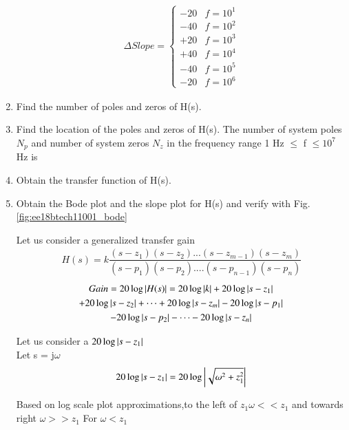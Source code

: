 \begin{enumerate}[label=\thesection.\arabic*.,ref=\thesection.\theenumi]
\begin{align}
 \Delta Slope = 
 \begin{cases} 
      -20 &  f = 10^{1} \\
      -40 &  f = 10^{2} \\
      +20 &  f = 10^{3} \\
      +40 &  f = 10^{4} \\
      -40 &  f = 10^{5} \\
      -20 &  f = 10^{6} 
 \end{cases}
\end{align}

\item Find the number of poles and zeros of H(s).
\\
\solution 

\item Find the location of the poles and zeros of H(s).
The number of system poles $N_{p}$ and number of system zeros $N_{z}$ in the frequency range 1 Hz $\leq$ f $\leq 10^{7}$ Hz is

\item Obtain the transfer function of H(s).
\item Obtain the Bode plot and the slope plot for H(s) and verify with  Fig. \ref{fig:ee18btech11001_bode}

\solution 
\textsf{Let us consider a generalized transfer gain}
\\
\begin{align}
	H(s) = k \dfrac{(s-z_{1})(s-z_{2})...(s-z_{m-1})(s-z_{m})}{(s-p_{1})(s-p_{2})....(s-p_{n-1})(s-p_{n})}
\end{align}
\begin{multline}
Gain = 20\log\left\vert H(s)\right\vert = 20\log \left\vert k\right\vert + 20\log \left\vert s-z_{1}\right\vert 
    \\
    + 20\log \left\vert s-z_{2}\right\vert + \dots + 20\log \left\vert s-z_{m}\right\vert - 20\log \left\vert s-p_{1}\right\vert 
    \\
    - 20\log \left\vert s-p_{2}\right\vert - \dots - 20\log \left\vert s-z_{n}\right\vert 
\end{multline}



Let us consider a $ 20\log \left\vert s-z_{1}\right\vert $
\\
Let s = j$\omega$
\\

\begin{align}
	20\log \left\vert s-z_{1}\right\vert = 20\log \left\vert\sqrt{\omega^{2} + z_{1}^{2}}\right\vert 
\end{align}

Based on log scale plot approximations,to the 
left of $z_{1} \omega << z_{1}$  and towards right  $ \omega >> z_{1}$ 
For $\omega < z_{1}$


\end{enumerate}
